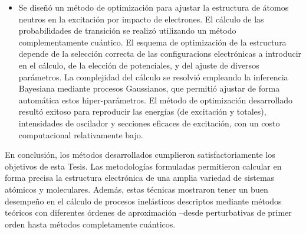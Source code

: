 \begin{itemize}
\item
Se diseñó un método de optimización para ajustar la estructura de 
átomos neutros en la excitación por impacto de electrones. El cálculo 
de las probabilidades de transición se realizó utilizando un método 
complementamente cuántico. El esquema de optimización de la estructura 
depende de la selección correcta de las configuracions electrónicas a 
introducir en el cálculo, de la elección de potenciales, y del ajuste 
de diversos parámetros. La complejidad del cálculo se resolvió empleando 
la inferencia Bayesiana mediante procesos Gaussianos, que permitió 
ajustar de forma automática estos hiper-parámetros. El método de 
optimización desarrollado resultó exitoso para reproducir las energías 
(de excitación y totales), intensidades de oscilador y secciones 
eficaces de excitación, con un costo computacional relativamente bajo.
\end{itemize}
%
En conclusión, los métodos desarrollados cumplieron satisfactoriamente 
los objetivos de esta Tesis. Las metodologías formuladas permitieron 
calcular en forma precisa la estructura electrónica de una amplia 
variedad de sistemas atómicos y moleculares. Además, estas técnicas 
mostraron tener
un buen desempeño en el cálculo de procesos inelásticos descriptos 
mediante métodos teóricos con diferentes órdenes de aproximación --desde 
perturbativas de primer orden hasta métodos completamente cuánticos. 


